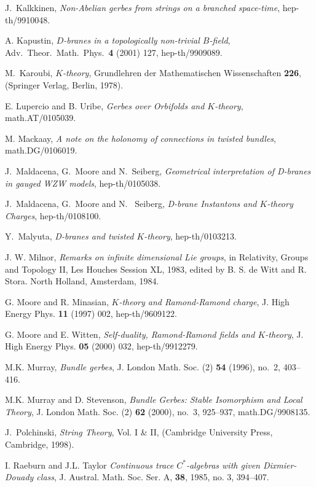 \documentclass[a4paper,reqno]{amsart}
\theoremstyle{plain}
\theoremstyle{definition}
\theoremstyle{remark}
\numberwithin{equation}{section}
\numberwithin{figure}{section}
\newcommand{\<}{\langle}
\renewcommand{\>}{\rangle}
\begin{document}
\begin{thebibliography}{99}
J.~Kalkkinen, {\it Non-Abelian gerbes from strings on a branched
space-time}, hep-th/9910048.

A. Kapustin,
{\it $D$-branes in a topologically non-trivial $B$-field},
Adv.\ Theor.\ Math.\ Phys.\ {\bf 4} (2001) 127, hep-th/9909089.

M.~Karoubi, {\it $K$-theory}, Grundlehren der Mathematischen
Wissenschaften {\bf 226}, (Springer Verlag, Berlin, 1978).

E. Lupercio and B. Uribe,
{\it Gerbes over Orbifolds and $K$-theory},
math.AT/0105039.

M. Mackaay,
{\it A note on the holonomy of connections in twisted bundles},
math.DG/0106019.

J.~Maldacena, G.~Moore and N.~Seiberg, {\it Geometrical
interpretation of D-branes in gauged WZW models}, hep-th/0105038.

J.~Maldacena, G.~Moore and N. ~Seiberg, {\it D-brane Instantons 
and $K$-theory Charges}, hep-th/0108100. 

Y.~Malyuta, {\it D-branes and twisted $K$-theory}, hep-th/0103213.

J. W. Milnor, {\it Remarks on infinite dimensional Lie groups}, 
in Relativity, Groups and Topology II, Les Houches Session XL, 
1983, edited by B. S. de Witt and R. Stora.  North Holland, 
Amsterdam, 1984. 

G. Moore and R. Minasian,
{\it $K$-theory and Ramond-Ramond charge},
J. High Energy Phys. {\bf 11} (1997) 002, hep-th/9609122.

G. Moore and E. Witten,
{\it Self-duality, Ramond-Ramond fields and $K$-theory},
J. High Energy Phys. {\bf 05} (2000) 032,
hep-th/9912279.

M.K. Murray, {\it Bundle gerbes},
J. London Math. Soc. (2) {\bf 54}
(1996), no.~2, 403--416.

M.K. Murray and D. Stevenson, {\it Bundle Gerbes: Stable
Isomorphism and Local Theory}, J. London Math. Soc. (2) {\bf 62}
(2000), no.~3, 925--937, math.DG/9908135.

J.~Polchinski, {\it String Theory}, Vol. I \& II,
(Cambridge University Press, Cambridge, 1998).

I. Raeburn and J.L. Taylor
{\sl Continuous trace $C^*$-algebras with given Dixmier-Douady class},
J. Austral. Math. Soc. Ser. A, {\bf 38}, 1985, no. 3,
394--407.


\end{thebibliography}
\end{document}
